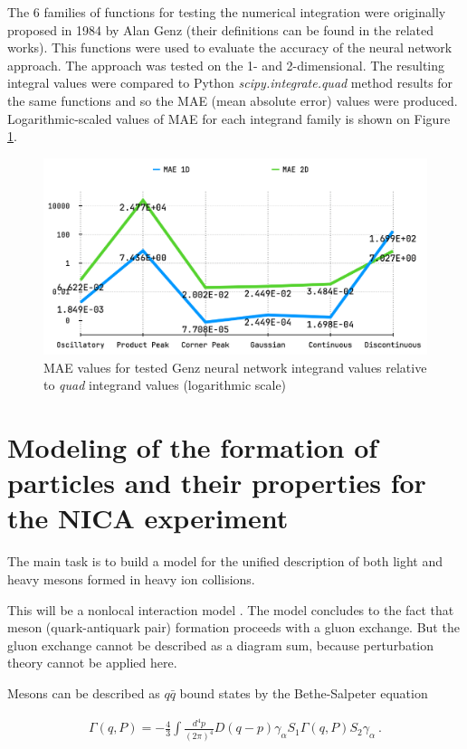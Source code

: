 \documentclass[%
]{ittmm}
\begin{document}
The 6 families of functions for testing the numerical integration were originally proposed in 1984 by Alan Genz\cite{genz} (their definitions can be found in the related works). This functions were used to evaluate the accuracy of the neural network approach. The approach was tested on the 1- and 2-dimensional. The resulting integral values were compared to Python \textit{scipy.integrate.quad} method results for the same functions and so the MAE (mean absolute error) values were produced. Logarithmic-scaled values of MAE for each integrand family is shown on Figure \ref{fig:genz-tests}.

\begin{figure}
\centering
\includegraphics[width=0.85\linewidth]{maes.png}
\caption{ MAE values for tested Genz neural network integrand values relative to \textit{quad} integrand values (logarithmic scale)}
\label{fig:genz-tests}
\end{figure}


\section{Modeling of the formation of particles and their properties for the NICA experiment}

The main task is to build a model for the unified description of both light and heavy mesons formed in heavy ion collisions.

 This will be a nonlocal interaction model \cite{schmidt, costa}. 
 The model concludes to the fact that meson (quark-antiquark pair) formation proceeds with a gluon exchange. But the gluon exchange cannot be described as a diagram sum, because perturbation theory cannot be applied here. 
 
 Mesons can be described as $q\bar{q}$ bound states by 
the Bethe-Salpeter equation

\begin{eqnarray}\label{BS}
  \Gamma (q,P) = -\frac{4}{3} \int \frac{d^4 p}{(2\pi)^4}
  D(q-p) \gamma_\alpha S_1 \Gamma (q,P)
S_2 \gamma_\alpha \  .
\end{eqnarray}
\end{document}
